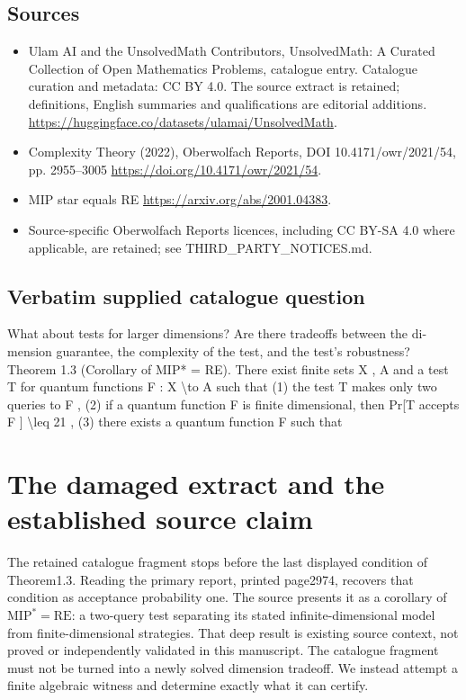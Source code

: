 \documentclass[11pt]{article}
\begin{document}
\subsection{Sources}
\begin{itemize}
\item[S1] Ulam AI and the UnsolvedMath Contributors, UnsolvedMath: A Curated Collection of Open Mathematics Problems, catalogue entry. Catalogue curation and metadata: CC BY 4.0. The source extract is retained; definitions, English summaries and qualifications are editorial additions.
\url{https://huggingface.co/datasets/ulamai/UnsolvedMath}.
\item[S2] Complexity Theory (2022), Oberwolfach Reports, DOI 10.4171/owr/2021/54, pp. 2955--3005
\url{https://doi.org/10.4171/owr/2021/54}.
\item[S3] MIP star equals RE
\url{https://arxiv.org/abs/2001.04383}.
\item Source-specific Oberwolfach Reports licences, including CC BY-SA 4.0 where applicable, are retained; see THIRD\_PARTY\_NOTICES.md.
\end{itemize}
\subsection{Verbatim supplied catalogue question}
What about tests for larger dimensions? Are there tradeoffs between the di- mension guarantee, the complexity of the test, and the test’s robustness? Theorem 1.3 (Corollary of MIP* = RE). There exist finite sets X , A and a test T for quantum functions F : X \textbackslash{}to A such that (1) the test T makes only two queries to F , (2) if a quantum function F is finite dimensional, then Pr[T accepts F ] \textbackslash{}leq 21 , (3) there exists a quantum function F such that

\section{The damaged extract and the established source claim}
The retained catalogue fragment stops before the last displayed
condition of Theorem1.3. Reading the primary report, printed
page2974, recovers that condition as acceptance probability one.
The source presents it as a corollary of $\mathrm{MIP}^*=\mathrm{RE}$:
a two-query test separating its stated infinite-dimensional model
from finite-dimensional strategies. That deep result is existing
source context, not proved or independently validated in this
manuscript. The catalogue fragment must not be turned into a
newly solved dimension tradeoff. We instead attempt a finite
algebraic witness and determine exactly what it can certify.
\end{document}
